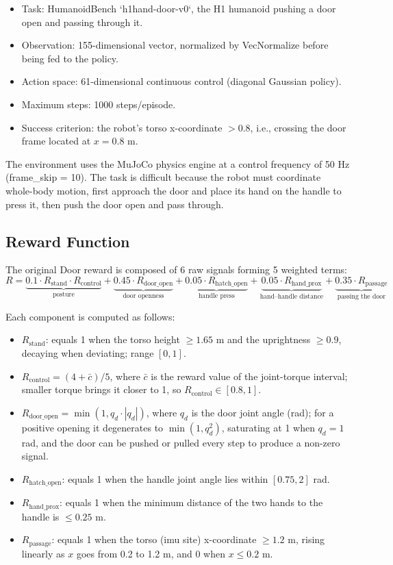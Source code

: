 \begin{itemize}
  \item Task: HumanoidBench `h1hand-door-v0`, the H1 humanoid pushing a door open and passing through it.
  \item Observation: 155-dimensional vector, normalized by VecNormalize before being fed to the policy.
  \item Action space: 61-dimensional continuous control (diagonal Gaussian policy).
  \item Maximum steps: 1000 steps/episode.
  \item Success criterion: the robot's torso x-coordinate $> 0.8$, i.e., crossing the door frame located at $x = 0.8$ m.
\end{itemize}

The environment uses the MuJoCo physics engine at a control frequency of 50 Hz (frame\_skip = 10). The task is difficult because the robot must coordinate whole-body motion, first approach the door and place its hand on the handle to press it, then push the door open and pass through.

\subsection{Reward Function}

The original Door reward is composed of 6 raw signals forming 5 weighted terms:
\begin{equation}
  R = \underbrace{0.1 \cdot R_\text{stand} \cdot R_\text{control}}_{\text{posture}} + \underbrace{0.45 \cdot R_\text{door\_open}}_{\text{door openness}} + \underbrace{0.05 \cdot R_\text{hatch\_open}}_{\text{handle press}} + \underbrace{0.05 \cdot R_\text{hand\_prox}}_{\text{hand--handle distance}} + \underbrace{0.35 \cdot R_\text{passage}}_{\text{passing the door}}
\end{equation}

Each component is computed as follows:
\begin{itemize}
  \item $R_\text{stand}$: equals 1 when the torso height $\geq 1.65$ m and the uprightness $\geq 0.9$, decaying when deviating; range $[0, 1]$.
  \item $R_\text{control} = (4 + \bar{c})/5$, where $\bar{c}$ is the reward value of the joint-torque interval; smaller torque brings it closer to 1, so $R_\text{control} \in [0.8, 1]$.
  \item $R_\text{door\_open} = \min(1, q_d \cdot |q_d|)$, where $q_d$ is the door joint angle (rad); for a positive opening it degenerates to $\min(1, q_d^2)$, saturating at 1 when $q_d = 1$ rad, and the door can be pushed or pulled every step to produce a non-zero signal.
  \item $R_\text{hatch\_open}$: equals 1 when the handle joint angle lies within $[0.75, 2]$ rad.
  \item $R_\text{hand\_prox}$: equals 1 when the minimum distance of the two hands to the handle is $\leq 0.25$ m.
  \item $R_\text{passage}$: equals 1 when the torso (imu site) x-coordinate $\geq 1.2$ m, rising linearly as $x$ goes from 0.2 to 1.2 m, and 0 when $x \leq 0.2$ m.
\end{itemize}

